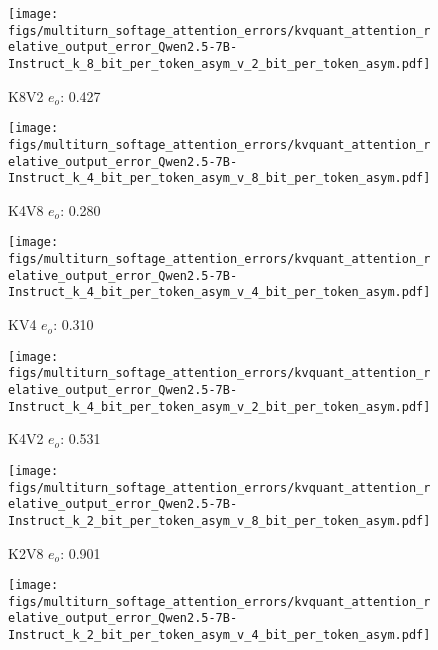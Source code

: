 \begin{figure*}
    \begin{subfigure}{0.25\columnwidth}
    \texttt{[image: figs/multiturn\_softage\_attention\_errors/kvquant\_attention\_relative\_output\_error\_Qwen2.5-7B-Instruct\_k\_8\_bit\_per\_token\_asym\_v\_2\_bit\_per\_token\_asym.pdf]}
    \caption{K8V2 $e_o$: 0.427}
    \label{fig:kvcache_simulated_quant_error_layer_wise_k8_bit_per_token_asym_v2_per_token_asym_Qwen2.5-7B-Instruct_multirurn_softage}
    \end{subfigure}
    \begin{subfigure}{0.25\columnwidth}
    \texttt{[image: figs/multiturn\_softage\_attention\_errors/kvquant\_attention\_relative\_output\_error\_Qwen2.5-7B-Instruct\_k\_4\_bit\_per\_token\_asym\_v\_8\_bit\_per\_token\_asym.pdf]}
    \caption{K4V8 $e_o$: 0.280}
    \label{fig:kvcache_simulated_quant_error_layer_wise_k4_bit_per_token_asym_v8_per_token_asym_Qwen2.5-7B-Instruct_multirurn_softage}
    \end{subfigure}
    \begin{subfigure}{0.25\columnwidth}
    \texttt{[image: figs/multiturn\_softage\_attention\_errors/kvquant\_attention\_relative\_output\_error\_Qwen2.5-7B-Instruct\_k\_4\_bit\_per\_token\_asym\_v\_4\_bit\_per\_token\_asym.pdf]}
    \caption{KV4 $e_o$: 0.310}
    \label{fig:kvcache_simulated_quant_error_layer_wise_k4_bit_per_token_asym_v4_per_token_asym_Qwen2.5-7B-Instruct_multirurn_softage}
    \end{subfigure}
    \begin{subfigure}{0.25\columnwidth}
    \texttt{[image: figs/multiturn\_softage\_attention\_errors/kvquant\_attention\_relative\_output\_error\_Qwen2.5-7B-Instruct\_k\_4\_bit\_per\_token\_asym\_v\_2\_bit\_per\_token\_asym.pdf]}
    \caption{K4V2 $e_o$: 0.531}
    \label{fig:kvcache_simulated_quant_error_layer_wise_k4_bit_per_token_asym_v2_per_token_asym_Qwen2.5-7B-Instruct_multirurn_softage}
    \end{subfigure}
    \begin{subfigure}{0.25\columnwidth}
    \texttt{[image: figs/multiturn\_softage\_attention\_errors/kvquant\_attention\_relative\_output\_error\_Qwen2.5-7B-Instruct\_k\_2\_bit\_per\_token\_asym\_v\_8\_bit\_per\_token\_asym.pdf]}
    \caption{K2V8 $e_o$: 0.901}
    \label{fig:kvcache_simulated_quant_error_layer_wise_k2_bit_per_token_asym_v8_per_token_asym_Qwen2.5-7B-Instruct_multirurn_softage}
    \end{subfigure}
    \begin{subfigure}{0.25\columnwidth}
    \texttt{[image: figs/multiturn\_softage\_attention\_errors/kvquant\_attention\_relative\_output\_error\_Qwen2.5-7B-Instruct\_k\_2\_bit\_per\_token\_asym\_v\_4\_bit\_per\_token\_asym.pdf]}

\end{subfigure}
\end{figure*}
